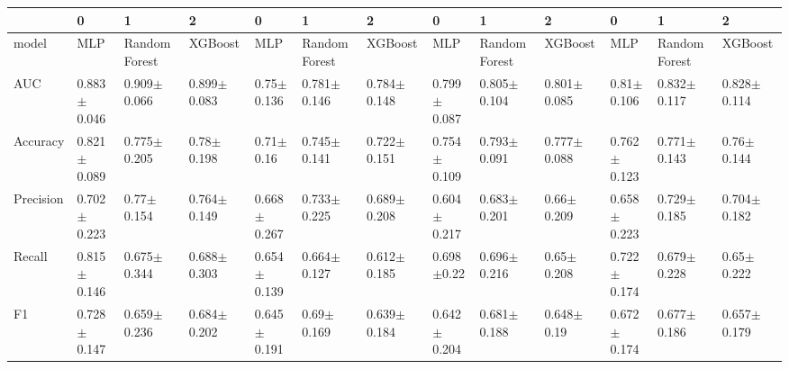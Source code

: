 \begin{tabular}{lllllllllllll}
\toprule
 & 0 & 1 & 2 & 0 & 1 & 2 & 0 & 1 & 2 & 0 & 1 & 2 \\
\midrule
model & MLP & Random Forest & XGBoost & MLP & Random Forest & XGBoost & MLP & Random Forest & XGBoost & MLP & Random Forest & XGBoost \\
AUC & 0.883$\pm$0.046 & 0.909$\pm$0.066 & 0.899$\pm$0.083 & 0.75$\pm$0.136 & 0.781$\pm$0.146 & 0.784$\pm$0.148 & 0.799$\pm$0.087 & 0.805$\pm$0.104 & 0.801$\pm$0.085 & 0.81$\pm$0.106 & 0.832$\pm$0.117 & 0.828$\pm$0.114 \\
Accuracy & 0.821$\pm$0.089 & 0.775$\pm$0.205 & 0.78$\pm$0.198 & 0.71$\pm$0.16 & 0.745$\pm$0.141 & 0.722$\pm$0.151 & 0.754$\pm$0.109 & 0.793$\pm$0.091 & 0.777$\pm$0.088 & 0.762$\pm$0.123 & 0.771$\pm$0.143 & 0.76$\pm$0.144 \\
Precision & 0.702$\pm$0.223 & 0.77$\pm$0.154 & 0.764$\pm$0.149 & 0.668$\pm$0.267 & 0.733$\pm$0.225 & 0.689$\pm$0.208 & 0.604$\pm$0.217 & 0.683$\pm$0.201 & 0.66$\pm$0.209 & 0.658$\pm$0.223 & 0.729$\pm$0.185 & 0.704$\pm$0.182 \\
Recall & 0.815$\pm$0.146 & 0.675$\pm$0.344 & 0.688$\pm$0.303 & 0.654$\pm$0.139 & 0.664$\pm$0.127 & 0.612$\pm$0.185 & 0.698$\pm$0.22 & 0.696$\pm$0.216 & 0.65$\pm$0.208 & 0.722$\pm$0.174 & 0.679$\pm$0.228 & 0.65$\pm$0.222 \\
F1 & 0.728$\pm$0.147 & 0.659$\pm$0.236 & 0.684$\pm$0.202 & 0.645$\pm$0.191 & 0.69$\pm$0.169 & 0.639$\pm$0.184 & 0.642$\pm$0.204 & 0.681$\pm$0.188 & 0.648$\pm$0.19 & 0.672$\pm$0.174 & 0.677$\pm$0.186 & 0.657$\pm$0.179 \\
\bottomrule
\end{tabular}
